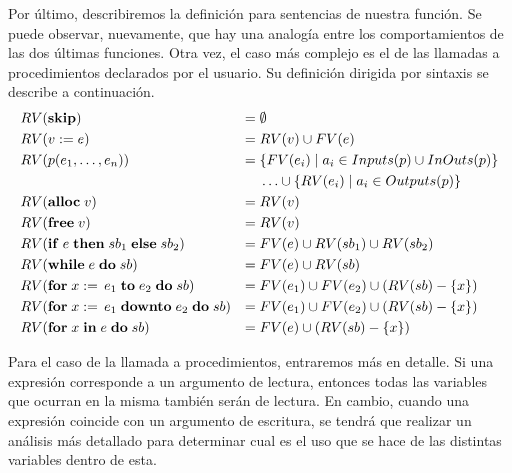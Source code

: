 \documentclass{article}
\begin{document}
Por último, describiremos la definición para sentencias de nuestra función.
Se puede observar, nuevamente, que hay una analogía entre los comportamientos de las dos últimas funciones.
Otra vez, el caso más complejo es el de las llamadas a procedimientos declarados por el usuario.
Su definición dirigida por sintaxis se describe a continuación.
\begin{align*}
&RV(\mathbf{skip})
&=&\;
\emptyset
\\
&RV(v := e)
&=&\;
RV(v) \cup FV(e)
\\
&RV(p(e_1, \ldots, e_n))
&=&\;
\{ FV(e_i) \mid a_i \in Inputs(p) \cup InOuts(p) \}
\\
&&&
\;\ldots\cup
\{ RV(e_i) \mid a_i \in Outputs(p) \}
\\
&RV(\mathbf{alloc} \; v)
&=&\;
RV(v)
\\
&RV(\mathbf{free} \; v)
&=&\;
RV(v)
\\
&RV(\mathbf{if} \; e \; \mathbf{then} \; sb_1 \; \mathbf{else} \; sb_2)
&=&\;
FV(e) \cup RV(sb_1) \cup RV(sb_2)
\\
&RV(\mathbf{while} \; e \; \mathbf{do} \; sb)
&=&\;
FV(e) \cup RV(sb)
\\
&RV(\mathbf{for} \; x := \, e_1 \; \mathbf{to} \; e_2 \; \mathbf{do} \; sb)
&=&\;
FV(e_1) \cup FV(e_2) \cup (RV(sb) - \{ x \})
\\
&RV(\mathbf{for} \; x := \, e_1 \; \mathbf{downto} \; e_2 \; \mathbf{do} \; sb)
&=&\;
FV(e_1) \cup FV(e_2) \cup (RV(sb) - \{ x \})
\\
&RV(\mathbf{for} \; x \; \mathbf{in} \; e \; \mathbf{do} \; sb)
&=&\;
FV(e) \cup (RV(sb) - \{ x \})
\end{align*}

Para el caso de la llamada a procedimientos, entraremos más en detalle.
Si una expresión corresponde a un argumento de lectura, entonces todas las variables que ocurran en la misma también serán de lectura.
En cambio, cuando una expresión coincide con un argumento de escritura, se tendrá que realizar un análisis más detallado para determinar cual es el uso que se hace de las distintas variables dentro de esta.


\end{document}
